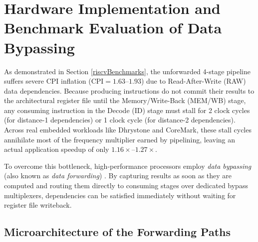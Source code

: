 \section{Hardware Implementation and Benchmark Evaluation of Data Bypassing}\label{riscvBypassing}

As demonstrated in Section \ref{riscvBenchmarks}, the unforwarded 4-stage pipeline suffers severe CPI inflation ($\text{CPI} = 1.63\text{--}1.93$) due to Read-After-Write (RAW) data dependencies. Because producing instructions do not commit their results to the architectural register file until the Memory/Write-Back (MEM/WB) stage, any consuming instruction in the Decode (ID) stage must stall for 2 clock cycles (for distance-1 dependencies) or 1 clock cycle (for distance-2 dependencies). Across real embedded workloads like Dhrystone and CoreMark, these stall cycles annihilate most of the frequency multiplier earned by pipelining, leaving an actual application speedup of only $1.16\times\text{--}1.27\times$.

To overcome this bottleneck, high-performance processors employ \textit{data bypassing} (also known as \textit{data forwarding}) \cite{patterson2017computer}. By capturing results as soon as they are computed and routing them directly to consuming stages over dedicated bypass multiplexers, dependencies can be satisfied immediately without waiting for register file writeback.

\subsection{Microarchitecture of the Forwarding Paths}


